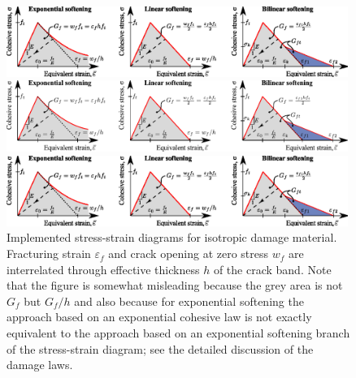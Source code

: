 \documentclass[a4paper]{article}
\begin{document}
\begin{figure}[!htb]
\begin{htmlonly}
  \centerline{\includegraphics[width=0.99\textwidth]{Damage_material_diag.eps}}
\end{htmlonly}
\ifpdf
 \centerline{\includegraphics[width=0.99\textwidth]{Damage_material_diag.pdf}}
\else
 \centerline{\includegraphics[width=0.99\textwidth]{Damage_material_diag.eps}}
\fi
  \caption{Implemented stress-strain diagrams for isotropic damage material. Fracturing strain $\varepsilon_f$ and crack opening at zero stress $w_f$ are interrelated through effective thickness $h$ of the crack band. Note that the
figure is somewhat misleading because the grey area is not $G_f$ but $G_f/h$ 
and also because for exponential softening the approach based on an exponential cohesive law is not exactly equivalent to the approach based on an exponential softening branch of the stress-strain diagram; see the detailed discussion of the damage laws.}
  \label{idm_softening}
\end{figure}
\end{document}
